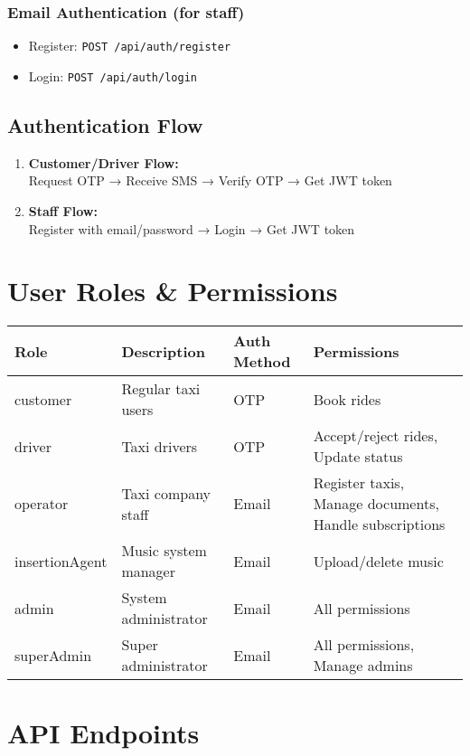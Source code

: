 \documentclass[11pt,a4paper]{article}
\begin{document}
\subsubsection{Email Authentication (for staff)}
\begin{itemize}
    \item Register: \texttt{POST /api/auth/register}
    \item Login: \texttt{POST /api/auth/login}
\end{itemize}

\subsection{Authentication Flow}
\begin{enumerate}
    \item \textbf{Customer/Driver Flow:}\\
    Request OTP → Receive SMS → Verify OTP → Get JWT token
    \item \textbf{Staff Flow:}\\
    Register with email/password → Login → Get JWT token
\end{enumerate}

\section{User Roles \& Permissions}
\begin{center}
\begin{tabular}{|p{2cm}|p{3cm}|p{3cm}|p{5cm}|}
\hline
\textbf{Role} & \textbf{Description} & \textbf{Auth Method} & \textbf{Permissions} \\
\hline
customer & Regular taxi users & OTP & Book rides \\
\hline
driver & Taxi drivers & OTP & Accept/reject rides, Update status \\
\hline
operator & Taxi company staff & Email & Register taxis, Manage documents, Handle subscriptions \\
\hline
insertionAgent & Music system manager & Email & Upload/delete music \\
\hline
admin & System administrator & Email & All permissions \\
\hline
superAdmin & Super administrator & Email & All permissions, Manage admins \\
\hline
\end{tabular}
\end{center}

\section{API Endpoints}
\end{document}

